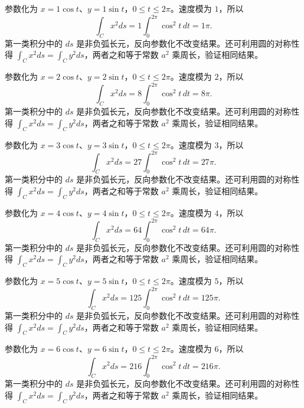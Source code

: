 \documentclass[UTF8,12pt,a4paper,fontset=fandol]{ctexart}
\begin{document}
\begin{solve}\label{ans:c41q2}
参数化为 $x=1\cos t$、$y=1\sin t$，$0\le t\le2\pi$。速度模为 $1$，所以
\[
\int_Cx^2ds=1\int_0^{2\pi}\cos^2t\,dt=1\pi.
\]
第一类积分中的 $ds$ 是非负弧长元，反向参数化不改变结果。还可利用圆的对称性得 $\int_Cx^2ds=\int_Cy^2ds$，两者之和等于常数 $a^2$ 乘周长，验证相同结果。
\end{solve}

\begin{solve}\label{ans:c41q3}
参数化为 $x=2\cos t$、$y=2\sin t$，$0\le t\le2\pi$。速度模为 $2$，所以
\[
\int_Cx^2ds=8\int_0^{2\pi}\cos^2t\,dt=8\pi.
\]
第一类积分中的 $ds$ 是非负弧长元，反向参数化不改变结果。还可利用圆的对称性得 $\int_Cx^2ds=\int_Cy^2ds$，两者之和等于常数 $a^2$ 乘周长，验证相同结果。
\end{solve}

\begin{solve}\label{ans:c41q4}
参数化为 $x=3\cos t$、$y=3\sin t$，$0\le t\le2\pi$。速度模为 $3$，所以
\[
\int_Cx^2ds=27\int_0^{2\pi}\cos^2t\,dt=27\pi.
\]
第一类积分中的 $ds$ 是非负弧长元，反向参数化不改变结果。还可利用圆的对称性得 $\int_Cx^2ds=\int_Cy^2ds$，两者之和等于常数 $a^2$ 乘周长，验证相同结果。
\end{solve}

\begin{solve}\label{ans:c41q5}
参数化为 $x=4\cos t$、$y=4\sin t$，$0\le t\le2\pi$。速度模为 $4$，所以
\[
\int_Cx^2ds=64\int_0^{2\pi}\cos^2t\,dt=64\pi.
\]
第一类积分中的 $ds$ 是非负弧长元，反向参数化不改变结果。还可利用圆的对称性得 $\int_Cx^2ds=\int_Cy^2ds$，两者之和等于常数 $a^2$ 乘周长，验证相同结果。
\end{solve}

\begin{solve}\label{ans:c41q6}
参数化为 $x=5\cos t$、$y=5\sin t$，$0\le t\le2\pi$。速度模为 $5$，所以
\[
\int_Cx^2ds=125\int_0^{2\pi}\cos^2t\,dt=125\pi.
\]
第一类积分中的 $ds$ 是非负弧长元，反向参数化不改变结果。还可利用圆的对称性得 $\int_Cx^2ds=\int_Cy^2ds$，两者之和等于常数 $a^2$ 乘周长，验证相同结果。
\end{solve}

\begin{solve}\label{ans:c41q7}
参数化为 $x=6\cos t$、$y=6\sin t$，$0\le t\le2\pi$。速度模为 $6$，所以
\[
\int_Cx^2ds=216\int_0^{2\pi}\cos^2t\,dt=216\pi.
\]
第一类积分中的 $ds$ 是非负弧长元，反向参数化不改变结果。还可利用圆的对称性得 $\int_Cx^2ds=\int_Cy^2ds$，两者之和等于常数 $a^2$ 乘周长，验证相同结果。
\end{solve}
\end{document}

